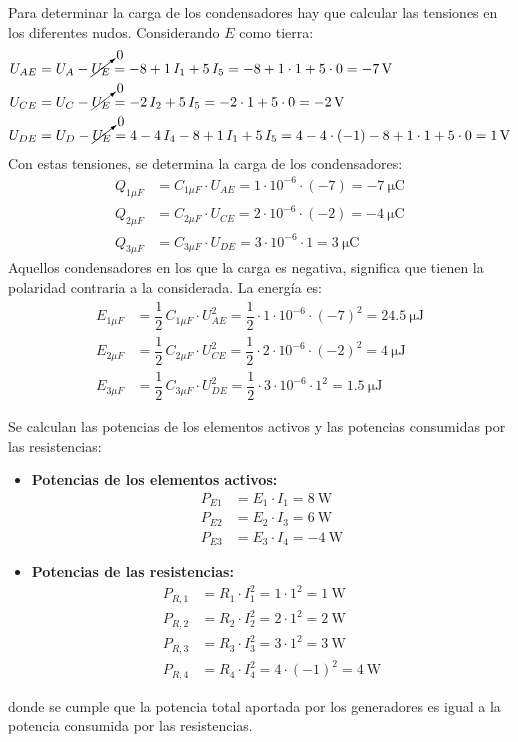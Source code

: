 Para determinar la carga de los condensadores hay que calcular las
tensiones en los diferentes nudos. Considerando $E$ como tierra:
\begin{align*}
  U_{AE}&=U_{A}-\cancelto{0}{U_{E}}=-8+1\,I_1+5\,I_5=-8+1\cdot 1 + 5\cdot 0=\qty{-7}{\volt}\\
  U_{CE}&=U_{C}-\cancelto{0}{U_{E}}=-2\,I_2+5\,I_5=-2\cdot 1+5\cdot 0 =\qty{-2}{\volt}\\
  U_{DE}&=U_{D}-\cancelto{0}{U_{E}}=4-4\, I_4-8+1\,I_1+5\,I_5=4-4\cdot (-1)-8+1\cdot 1 +5\cdot 0=\qty{1}{\volt}
\end{align*}
Con estas tensiones, se determina la carga de los condensadores:
\begin{align*}
  Q_{1\mu F} &= C_{1\mu F} \cdot U_{AE} = 1\cdot 10^{-6}\cdot (-7)=\qty{-7}{\micro\coulomb}\\
  Q_{2\mu F} &= C_{2\mu F} \cdot U_{CE} = 2\cdot 10^{-6}\cdot (-2)=\qty{-4}{\micro\coulomb}\\
  Q_{3\mu F} &= C_{3\mu F} \cdot U_{DE} = 3\cdot 10^{-6}\cdot 1=\qty{3}{\micro\coulomb}
\end{align*}
Aquellos condensadores en los que la carga es negativa, significa que
tienen la polaridad contraria a la considerada. La energía es:
\begin{align*}
  E_{1\mu F}&=\dfrac{1}{2}\,C_{1\mu F}\cdot U_{AE}^2 = \dfrac{1}{2}\cdot 1\cdot 10^{-6}\cdot (-7)^2 = \qty{24.5}{\micro\joule}\\
  E_{2\mu F}&=\dfrac{1}{2}\,C_{2\mu F}\cdot U_{CE}^2 = \dfrac{1}{2}\cdot 2\cdot 10^{-6}\cdot (-2)^2 = \qty{4}{\micro\joule}\\
  E_{3\mu F}&=\dfrac{1}{2}\,C_{3\mu F}\cdot U_{DE}^2 = \dfrac{1}{2}\cdot 3\cdot 10^{-6}\cdot 1^2 = \qty{1.5}{\micro\joule}
\end{align*}

Se calculan las potencias de los elementos activos y las potencias consumidas por las resistencias:
\begin{itemize}
\item \textbf{Potencias de los elementos activos:}
    \begin{align*}
      P_{E1} &= E_1 \cdot I_1 = \qty{8}{\watt}\\
      P_{E2} &= E_2 \cdot I_3 = \qty{6}{\watt}\\
      P_{E3} &= E_3 \cdot I_4 = -\qty{4}{\watt}
    \end{align*}
\item \textbf{Potencias de las resistencias:}
    \begin{align*}
      P_{R,1}&= R_1 \cdot I_1^2=1\cdot 1^2 = \qty{1}{\watt}\\
      P_{R,2}&= R_2 \cdot I_2^2=2\cdot 1^2 = \qty{2}{\watt}\\
      P_{R,3}&= R_3 \cdot I_3^2=3\cdot 1^2 = \qty{3}{\watt}\\
      P_{R,4}&= R_4 \cdot I_4^2=4\cdot (-1)^2 = \qty{4}{\watt}
    \end{align*}
\end{itemize}
donde se cumple que la potencia total aportada por los generadores es igual a la potencia consumida por las resistencias.

